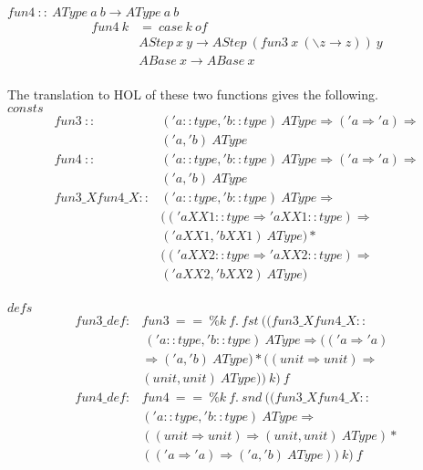 \documentclass{llncs}
\begin{document}
\noindent $ fun4 \ :: \ AType \ a \ b \to AType \ a \ b $
$$\begin{array}{ll}
fun4 \ k & = \ case \ k \ of \\ 
  & AStep \ x \ y \to AStep \ (fun3 \ x \ (\backslash z \to z)) \ y \\
   & ABase \ x \to ABase \ x \\
\end{array}$$

\noindent The translation to HOL of these two functions gives the following.\\

\noindent $consts$
$$\begin{array}{ll}
  fun3 \ :: & ('a::type, 'b::type) \ AType \Rightarrow ('a \Rightarrow
  'a) \Rightarrow \\ 
  & ('a, 'b) \ AType \\
  fun4 \ :: & ('a::type, 'b::type) \ AType \Rightarrow ('a \Rightarrow
  'a) \Rightarrow\\ 
  & ('a, 'b) \ AType \\
  fun3\_Xfun4\_X :: & ('a::type, 'b::type) \ AType \Rightarrow \\ 
  & (('aXX1::type \Rightarrow 'aXX1::type) \Rightarrow \\ 
  & ('aXX1, 'bXX1) \ AType) * \\
  & (('aXX2::type \Rightarrow 'aXX2::type) \Rightarrow \\ 
  & ('aXX2, 'bXX2) \ AType) \\
\end{array}$$

\noindent $defs$
$$\begin{array}{lll}
fun3\_def : & fun3 \ == \ \% k \ f. \ fst \ (( fun3\_Xfun4\_X ::  \\ 
  & \ ('a::type, 'b::type) \ AType \Rightarrow (('a \Rightarrow 'a) \\
  & \Rightarrow ('a, 'b) \ AType) * ((unit \Rightarrow unit) \Rightarrow \\ 
  & (unit, unit) \ AType) ) \ k) \ f \\
  fun4\_def : & fun4 \ == \ \% k \ f. \ snd \ (( fun3\_Xfun4\_X ::  \\ 
  & ('a::type, 'b::type) \ AType \Rightarrow \\
  & ((unit \Rightarrow unit) \Rightarrow (unit, unit) \ AType) * \\ 
  & (('a \Rightarrow 'a) \Rightarrow ('a, 'b) \ AType) ) \ k) \ f \\
\end{array}$$
\end{document}
